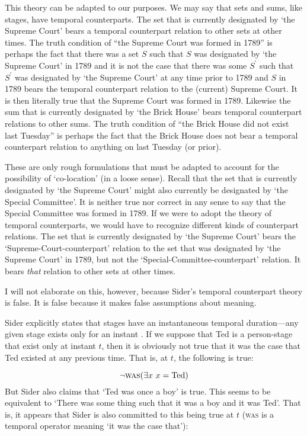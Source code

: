 \documentclass[11pt]{article}
\begin{document}
\begin{spacing}{1.5}
This theory can be adapted to our purposes.  We may say that sets and
sums, like stages, have temporal counterparts.  The set that is
currently designated by `the Supreme Court' bears a temporal
counterpart relation to other sets at other times.  The truth
condition of ``the Supreme Court was formed in 1789'' is perhaps the
fact that there was a set $S$ such that $S$ was designated by `the
Supreme Court' in 1789 and it is not the case that there was some
$S^{\prime}$ such that $S^{\prime}$ was designated by `the Supreme
Court' at any time prior to 1789 and $S$ in 1789 bears the temporal
counterpart relation to the (current) Supreme Court.  It is then
literally true that the Supreme Court was formed in 1789.  Likewise
the sum that is currently designated by `the Brick House' bears
temporal counterpart relations to other sums.  The truth condition of
``the Brick House did not exist last Tuesday'' is perhaps the fact
that the Brick House does not bear a temporal counterpart relation to
anything on last Tuesday (or prior).

These are only rough formulations that must be adapted to account for
the possibility of `co-location' (in a loose sense).  Recall that the
set that is currently designated by `the Supreme Court' might also
currently be designated by `the Special Committee'.  It is neither
true nor correct in any sense to say that the Special Committee was
formed in 1789.  If we were to adopt the theory of temporal
counterparts, we would have to recognize different kinds of
counterpart relations.  The set that is currently designated by `the
Supreme Court' bears the `Supreme-Court-counterpart' relation to the
set that was designated by `the Supreme Court' in 1789, but not the
`Special-Committee-counterpart' relation.  It bears {\em that}
relation to other sets at other times.

I will not elaborate on this, however, because Sider's temporal
counterpart theory is false.  It is false because it makes false
assumptions about meaning.

Sider explicitly states that stages have an instantaneous temporal
duration---any given stage exists only for an instant
\citeyearpar[xiv]{sider2001}.  If we suppose that Ted is a
person-stage that exist only at instant $t$, then it is obviously not
true that it was the case that Ted existed at any previous time.  That
is, at $t$, the following is true:

\begin{displaymath}
\neg \textsc{was} (\exists x\ x = \text{Ted})
\end{displaymath}
But Sider also claims that `Ted was once a boy' is true.  This seems
to be equivalent to `There was some thing such that it was a boy and
it was Ted'.  That is, it appears that Sider is also committed to this
being true at $t$ (\textsc{was} is a temporal operator meaning `it was
the case that'):


\end{spacing}
\end{document}
